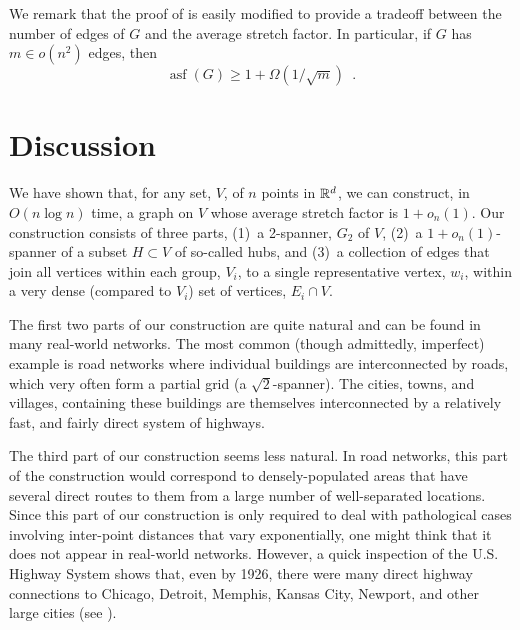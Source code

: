 \documentclass{patmorin}
\DeclareMathOperator{\asf}{asf}
\begin{document}
We remark that the proof of  is easily modified to
provide a tradeoff between the number of edges of $G$ and the average
stretch factor.  In particular, if $G$ has $m\in o(n^2)$ edges, then
\[
   \asf(G) \ge 1 + \Omega(1/\sqrt{m}) \enspace .
\]

\section{Discussion}

We have shown that, for any set, $V$, of $n$ points in $\mathbb{R}^d$, we can
construct, in $O(n\log n)$ time, a graph on $V$ whose average stretch
factor is $1+o_n(1)$.  Our construction consists of three parts, (1)~a
2-spanner, $G_2$ of $V$, (2)~a $1+o_n(1)$-spanner of a subset $H\subset V$
of so-called hubs, and (3)~a collection of edges that join all vertices
within each group, $V_i$, to a single representative vertex, $w_i$,
within a very dense (compared to $V_i$) set of vertices, $E_i\cap V$.

The first two parts of our construction are quite natural and can be
found in many real-world networks.  The most common (though admittedly,
imperfect) example is road networks where individual buildings are
interconnected by roads, which very often form a partial grid (a
$\sqrt{2}$-spanner). The cities, towns, and villages, containing these
buildings are themselves interconnected by a relatively fast, and fairly
direct system of highways.

The third part of our construction seems less natural.  In road networks,
this part of the construction would correspond to densely-populated
areas that have several direct routes to them from a large number of
well-separated locations.  Since this part of our construction is
only required to deal with pathological cases involving inter-point
distances that vary exponentially, one might think that it does not
appear in real-world networks.  However, a quick inspection of the
U.S. Highway System shows that, even by 1926, there were many direct
highway connections to Chicago, Detroit, Memphis, Kansas City, Newport,
and other large cities (see ).
\end{document}
